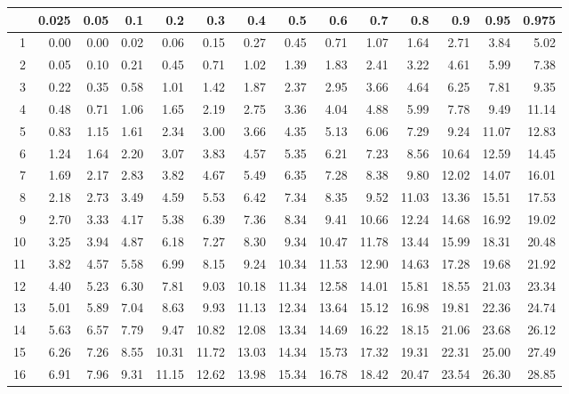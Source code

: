 \begin{table}[ht]
\centering
\begin{tabular}{rrrrrrrrrrrrrr}
  \hline
 & 0.025 & 0.05 & 0.1 & 0.2 & 0.3 & 0.4 & 0.5 & 0.6 & 0.7 & 0.8 & 0.9 & 0.95 & 0.975 \\ 
  \hline
  1 & 0.00 & 0.00 & 0.02 & 0.06 & 0.15 & 0.27 & 0.45 & 0.71 & 1.07 & 1.64 & 2.71 & 3.84 & 5.02 \\ 
  2 & 0.05 & 0.10 & 0.21 & 0.45 & 0.71 & 1.02 & 1.39 & 1.83 & 2.41 & 3.22 & 4.61 & 5.99 & 7.38 \\ 
  3 & 0.22 & 0.35 & 0.58 & 1.01 & 1.42 & 1.87 & 2.37 & 2.95 & 3.66 & 4.64 & 6.25 & 7.81 & 9.35 \\ 
  4 & 0.48 & 0.71 & 1.06 & 1.65 & 2.19 & 2.75 & 3.36 & 4.04 & 4.88 & 5.99 & 7.78 & 9.49 & 11.14 \\ 
  5 & 0.83 & 1.15 & 1.61 & 2.34 & 3.00 & 3.66 & 4.35 & 5.13 & 6.06 & 7.29 & 9.24 & 11.07 & 12.83 \\ 
  6 & 1.24 & 1.64 & 2.20 & 3.07 & 3.83 & 4.57 & 5.35 & 6.21 & 7.23 & 8.56 & 10.64 & 12.59 & 14.45 \\ 
  7 & 1.69 & 2.17 & 2.83 & 3.82 & 4.67 & 5.49 & 6.35 & 7.28 & 8.38 & 9.80 & 12.02 & 14.07 & 16.01 \\ 
  8 & 2.18 & 2.73 & 3.49 & 4.59 & 5.53 & 6.42 & 7.34 & 8.35 & 9.52 & 11.03 & 13.36 & 15.51 & 17.53 \\ 
  9 & 2.70 & 3.33 & 4.17 & 5.38 & 6.39 & 7.36 & 8.34 & 9.41 & 10.66 & 12.24 & 14.68 & 16.92 & 19.02 \\ 
  10 & 3.25 & 3.94 & 4.87 & 6.18 & 7.27 & 8.30 & 9.34 & 10.47 & 11.78 & 13.44 & 15.99 & 18.31 & 20.48 \\ 
  11 & 3.82 & 4.57 & 5.58 & 6.99 & 8.15 & 9.24 & 10.34 & 11.53 & 12.90 & 14.63 & 17.28 & 19.68 & 21.92 \\ 
  12 & 4.40 & 5.23 & 6.30 & 7.81 & 9.03 & 10.18 & 11.34 & 12.58 & 14.01 & 15.81 & 18.55 & 21.03 & 23.34 \\ 
  13 & 5.01 & 5.89 & 7.04 & 8.63 & 9.93 & 11.13 & 12.34 & 13.64 & 15.12 & 16.98 & 19.81 & 22.36 & 24.74 \\ 
  14 & 5.63 & 6.57 & 7.79 & 9.47 & 10.82 & 12.08 & 13.34 & 14.69 & 16.22 & 18.15 & 21.06 & 23.68 & 26.12 \\ 
  15 & 6.26 & 7.26 & 8.55 & 10.31 & 11.72 & 13.03 & 14.34 & 15.73 & 17.32 & 19.31 & 22.31 & 25.00 & 27.49 \\ 
  16 & 6.91 & 7.96 & 9.31 & 11.15 & 12.62 & 13.98 & 15.34 & 16.78 & 18.42 & 20.47 & 23.54 & 26.30 & 28.85 \\ 

\end{tabular}
\end{table}
